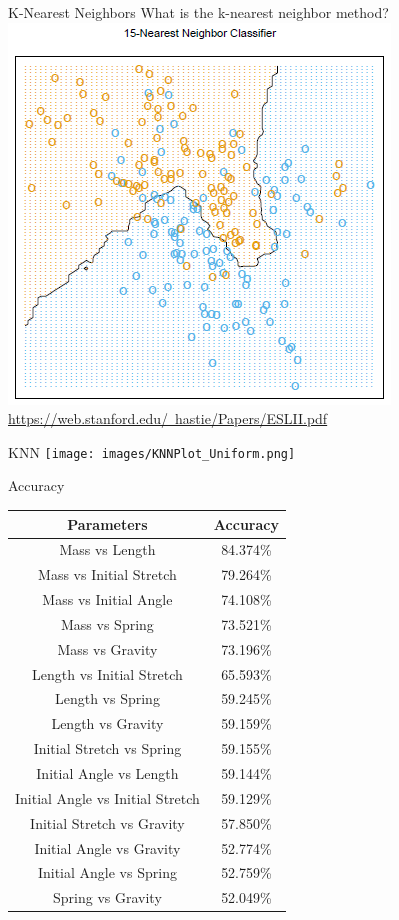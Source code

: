 \documentclass{beamer}
\begin{document}
\begin{frame}{K-Nearest Neighbors}
\centering
What is the k-nearest neighbor method? \\
\vspace{20 pt}
\includegraphics[scale=0.5]{images/KNNExample.png} \\
{\tiny \href{https://web.stanford.edu/~hastie/Papers/ESLII.pdf}{https://web.stanford.edu/~hastie/Papers/ESLII.pdf}}
\end{frame}

\begin{frame}{KNN}
\centering
\texttt{[image: images/KNNPlot\_Uniform.png]}
\end{frame}

\begin{frame}{Accuracy}
\centering
\small
    \begin{tabular}{| c | c |}
    \hline
    Parameters & Accuracy \\ \hline
    Mass vs Length & 84.374\% \\ 
    Mass vs Initial Stretch & 79.264\% \\ 
    Mass vs Initial Angle & 74.108\% \\
    Mass vs Spring & 73.521\% \\    
    Mass vs Gravity & 73.196\% \\
    Length vs Initial Stretch & 65.593\% \\
    Length vs Spring & 59.245\% \\
    Length vs Gravity & 59.159\% \\
    Initial Stretch vs Spring & 59.155\% \\    
    Initial Angle vs Length & 59.144\% \\
    Initial Angle vs Initial Stretch & 59.129\% \\
    Initial Stretch vs Gravity & 57.850\% \\
    Initial Angle vs Gravity & 52.774\% \\
   Initial Angle vs Spring & 52.759\% \\
   Spring vs Gravity & 52.049\% \\ \hline
\end{tabular} 
\end{frame}
\end{document}
